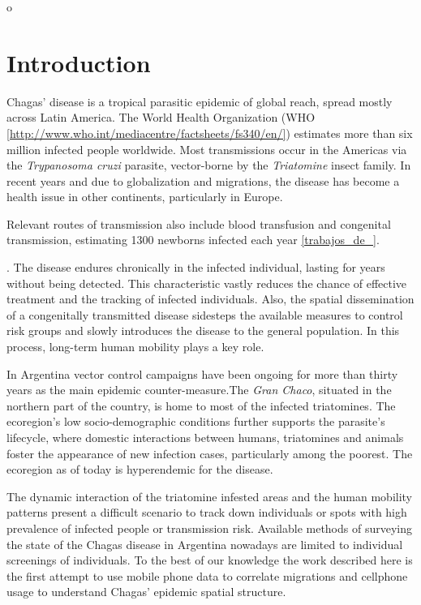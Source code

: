o\section{Introduction}

Chagas' disease is a tropical parasitic epidemic of global reach, spread mostly across Latin America. The World Health Organization (WHO \ref{http://www.who.int/mediacentre/factsheets/fs340/en/}) estimates more than six million infected people worldwide. Most transmissions occur in the Americas via the \textit{Trypanosoma cruzi} parasite, vector-borne by the \textit{Triatomine} insect family. In recent years and due to globalization and migrations, the disease has become a health issue in other continents, particularly in Europe. 

Relevant routes of transmission also include blood transfusion and congenital transmission, estimating 1300 newborns infected each year \ref{trabajos_de_}.\begin{comment}  en el drive estan las ppt del min salud \end{comment}. The disease endures chronically in the infected individual, lasting for years without being detected. This characteristic vastly reduces the chance of effective treatment and the tracking of infected individuals. Also, the spatial dissemination of a congenitally transmitted disease sidesteps the available measures to control risk groups and slowly introduces the disease to the general population. In this process, long-term human mobility plays a key role.

In Argentina vector control campaigns have been ongoing for more than thirty years as the main epidemic counter-measure.The \textit{Gran Chaco}, situated in the northern part of the country, is home to most of the infected triatomines. The ecoregion's low socio-demographic conditions further supports the parasite's lifecycle, where domestic interactions between humans, triatomines and animals foster the appearance of new infection cases, particularly among the poorest. The ecoregion as of today is hyperendemic for the disease.

The dynamic interaction of the triatomine infested areas and the human mobility patterns present a difficult scenario to track down individuals or spots with high prevalence of infected people or  transmission risk. Available methods of surveying the state of the Chagas disease in Argentina nowadays are limited to individual screenings of individuals. To the best of our knowledge the work described here is the first attempt to use mobile phone data to correlate migrations and cellphone usage to understand Chagas’ epidemic spatial structure.

